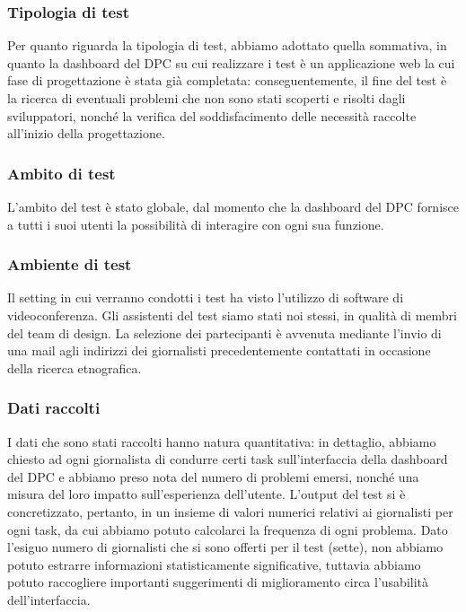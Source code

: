 \subsubsection{Tipologia di test}
\label{sss:tipologia-test}
Per quanto riguarda la tipologia di test, abbiamo adottato quella sommativa, in quanto la dashboard del DPC su cui realizzare i test è un applicazione web la cui fase di progettazione è stata già completata: conseguentemente, il fine del test è la ricerca di eventuali problemi che non sono stati scoperti e risolti dagli sviluppatori, nonché la verifica del soddisfacimento delle necessità raccolte all'inizio della progettazione.

\subsubsection{Ambito di test}
\label{sss:ambito-test}
L'ambito del test è stato globale, dal momento che la dashboard del DPC fornisce a tutti i suoi utenti la possibilità di interagire con ogni sua funzione.

\subsubsection{Ambiente di test}
\label{sss:ambiente-test}
Il setting in cui verranno condotti i test ha visto l'utilizzo di software di videoconferenza. Gli assistenti del test siamo stati noi stessi, in qualità di membri del team di design. La selezione dei partecipanti è avvenuta mediante l'invio di una mail agli indirizzi dei giornalisti precedentemente contattati in occasione della ricerca etnografica.

\subsubsection{Dati raccolti}
\label{sss:dati-raccolti}
I dati che sono stati raccolti hanno natura quantitativa: in dettaglio, abbiamo chiesto ad ogni giornalista di condurre certi task sull'interfaccia della dashboard del DPC e abbiamo preso nota del numero di problemi emersi, nonché una misura del loro impatto sull'esperienza dell'utente. L'output del test si è concretizzato, pertanto, in un insieme di valori numerici relativi ai giornalisti per ogni task, da cui abbiamo potuto calcolarci la frequenza di ogni problema.
Dato l'esiguo numero di giornalisti che si sono offerti per il test (sette), non abbiamo potuto estrarre informazioni statisticamente significative, tuttavia abbiamo potuto raccogliere importanti suggerimenti di miglioramento circa l'usabilità dell'interfaccia.

